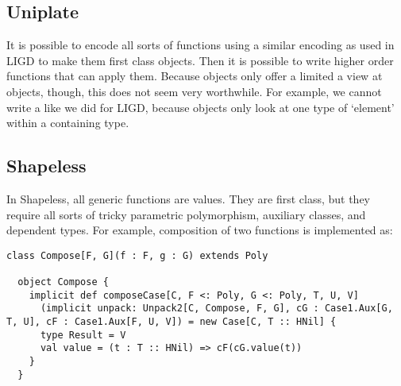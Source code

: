 

\subsection{Uniplate}
It is possible to encode all sorts of functions using a similar encoding
as used in LIGD to make them first class objects. Then it is possible to write
higher order functions that can apply them. Because  objects only offer
a limited a view at objects, though, this does not seem very worthwhile. For
example, we cannot write a  like we did for LIGD, because
 objects only look at one type of `element' within a containing
type.


\subsection{Shapeless}
In Shapeless, all generic functions are  values. They are first class,
but they require all sorts of tricky parametric polymorphism, auxiliary
classes, and dependent types. For example, composition of two functions is
implemented as:
\begin{lstlisting}[caption=Composition of two Poly values (copied from shapeless),style=breaklines]
  class Compose[F, G](f : F, g : G) extends Poly

  object Compose {
    implicit def composeCase[C, F <: Poly, G <: Poly, T, U, V]
      (implicit unpack: Unpack2[C, Compose, F, G], cG : Case1.Aux[G, T, U], cF : Case1.Aux[F, U, V]) = new Case[C, T :: HNil] {
      type Result = V
      val value = (t : T :: HNil) => cF(cG.value(t))
    }
  }
\end{lstlisting}
